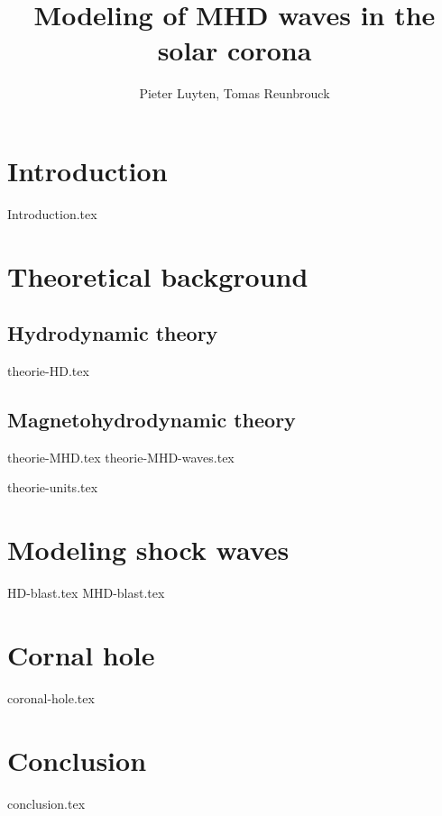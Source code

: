 \documentclass[a4paper]{article}
\title{Modeling of MHD waves in the solar corona}
\author{Pieter Luyten, Tomas Reunbrouck}
\begin{document}
\maketitle
\newpage
\tableofcontents
\newpage

\section{Introduction}
{Introduction.tex}


\section{Theoretical background}
\subsection{Hydrodynamic theory}
{theorie-HD.tex}
\subsection{Magnetohydrodynamic theory}
{theorie-MHD.tex}
{theorie-MHD-waves.tex}

{theorie-units.tex}
\newpage

\section{Modeling shock waves}
{HD-blast.tex}
{MHD-blast.tex}
\newpage

\section{Cornal hole}
{coronal-hole.tex}
\newpage

\section{Conclusion}
{conclusion.tex}

%
\end{document}
